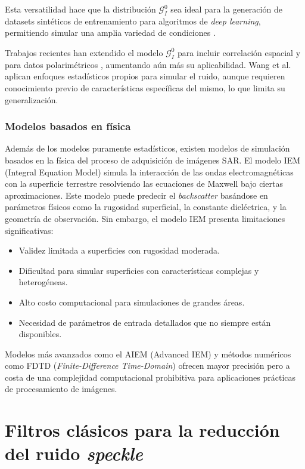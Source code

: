 Esta versatilidad hace que la distribución $\mathcal{G}_I^0$ sea ideal para la generación de datasets sintéticos de entrenamiento para algoritmos de \emph{deep learning}, permitiendo simular una amplia variedad de condiciones \cite{gomez2017unassisted}.

Trabajos recientes han extendido el modelo $\mathcal{G}_I^0$ para incluir correlación espacial \cite{bustos2002simulation} y para datos polarimétricos \cite{doulgeris2011automated}, aumentando aún más su aplicabilidad. Wang et al. \cite{wang2017sar} aplican enfoques estadísticos propios para simular el ruido, aunque requieren conocimiento previo de características específicas del mismo, lo que limita su generalización.

\subsubsection{Modelos basados en física}

Además de los modelos puramente estadísticos, existen modelos de simulación basados en la física del proceso de adquisición de imágenes SAR. El modelo IEM (Integral Equation Model) \cite{fung1992backscattering} simula la interacción de las ondas electromagnéticas con la superficie terrestre resolviendo las ecuaciones de Maxwell bajo ciertas aproximaciones. Este modelo puede predecir el \emph{backscatter} basándose en parámetros físicos como la rugosidad superficial, la constante dieléctrica, y la geometría de observación. Sin embargo, el modelo IEM presenta limitaciones significativas:
\begin{itemize}
	\item Validez limitada a superficies con rugosidad moderada.
	\item Dificultad para simular superficies con características complejas y heterogéneas.
	\item Alto costo computacional para simulaciones de grandes áreas.
	\item Necesidad de parámetros de entrada detallados que no siempre están disponibles.
\end{itemize}

Modelos más avanzados como el AIEM (Advanced IEM) \cite{chen2003note} y métodos numéricos como FDTD (\emph{Finite-Difference Time-Domain}) \cite{tsang2004scattering} ofrecen mayor precisión pero a costa de una complejidad computacional prohibitiva para aplicaciones prácticas de procesamiento de imágenes.

\section{Filtros clásicos para la reducción del ruido \emph{speckle}}

